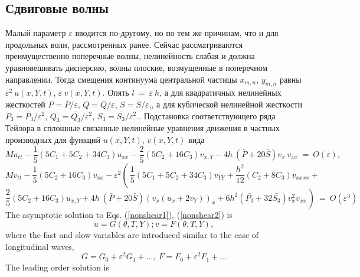\subsection{Сдвиговые волны}
Малый параметр $ \varepsilon $ вводится по-другому, но по тем же причинам, что и для продольных волн, рассмотренных ранее. Сейчас рассматриваются преимущественно поперечные волны, нелинейность слабая и должна уравновешивать дисперсию, волны плоские, возмущенные в поперечном направлении. Тогда смещения континуума центральной частицы $ x_{m, n} $, $ y_{m, n} $ равны $ \varepsilon^2 ~ u (x, Y, t)$, $\varepsilon ~ v (x, Y, t) $. Опять $l ~ = ~ \varepsilon ~ h $, а для квадратичных нелинейных жесткостей $P=\bar{P}/\varepsilon$, $Q=\bar{Q}/\varepsilon$, $S=\bar{S}/\varepsilon$,, а для кубической нелинейной жесткости $P_3=\bar{P_3}/\varepsilon^2$, $Q_3=\bar{Q_3}/\varepsilon^2$, $S_3=\bar{S_3}/\varepsilon^2$.. Подстановка соответствующего ряда Тейлора в сплошные связанные нелинейные уравнения движения в частных производных для функций $ u (x, Y, t) $, $ v (x, Y, t) $ вида
\begin{equation}
	M u_{tt}-\frac{1}{5} (5 C_1+5 C_2+34 C_3) u_{xx}-\frac{2}{5} (5 C_2+16 C_3) v_{x,Y}-4 h~ (\bar{P}+20 \bar{S}) v_x~ v_{xx}~=~O(\varepsilon),
	\label{nonshear1}
\end{equation}
\[
M v_{tt}-\frac{1}{5} (5 C_2+16 C_3) v_{xx}-
\varepsilon^2 \left(\frac{}{}\frac{1}{5} (5 C_1+5 C_2+34 C_3) v_{YY}+\frac{h^2}{12}  (C_2+8 C_3) v_{xxxx}+\right.
\]
\begin{equation}
	\left. \frac{2}{5} (5 C_2+16 C_3) u_{x,Y}+4 h~ (\bar{P}+20 \bar{S}) (v_x (u_{x}+2 v_{Y}))_x + 6 h^2 (\bar{P_3}+32 \bar{S_3}) v_x^2 v_{xx}\frac{}{}\right)~=~O(\varepsilon^3)
	\label{nonshear2}
\end{equation}
The asymptotic solution to Eqs. (\ref{nonshear1}), (\ref{nonshear2}) is
\[
u=  G\left(\theta, T ,Y\right); v=  F\left(\theta, T, Y\right),
\]
where the fast and slow variables are introduced similar to the case of longitudinal waves,
\[
G = G_0 + \varepsilon^2 G_1+...,~F = F_0+\varepsilon^2 F_1+...
\]
The leading order solution is

